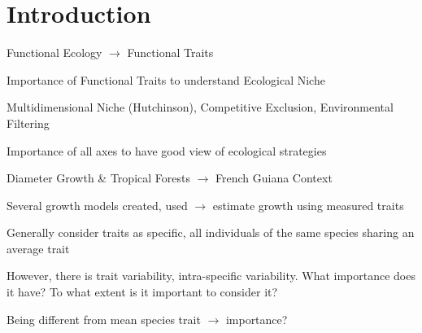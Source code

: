 \label{sec:Intro}
\section*{Introduction}

Functional Ecology $\rightarrow$ Functional Traits

Importance of Functional Traits to understand Ecological Niche

Multidimensional Niche (Hutchinson), Competitive Exclusion, Environmental Filtering

Importance of all axes to have good view of ecological strategies

Diameter Growth \& Tropical Forests $\rightarrow$ French Guiana Context

Several growth models created, used $\rightarrow$ estimate growth using measured traits

Generally consider traits as specific, all individuals of the same species sharing an average trait

However, there is trait variability, intra-specific variability. What importance does it have? To what extent is it important to consider it? 

Being different from mean species trait $\rightarrow$ importance?

